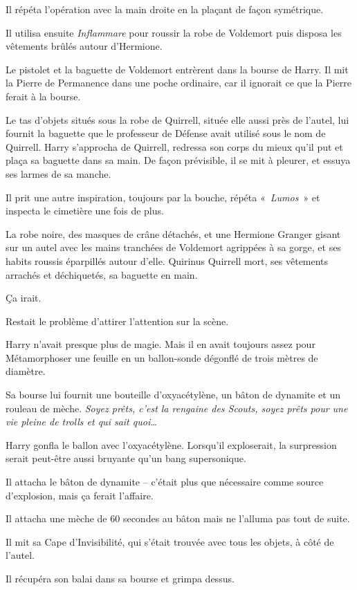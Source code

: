Il répéta l'opération avec la main droite en la plaçant de façon symétrique.

Il utilisa ensuite \emph{Inflammare} pour roussir la robe de Voldemort puis disposa les vêtements brûlés autour d'Hermione.

Le pistolet et la baguette de Voldemort entrèrent dans la bourse de Harry.
Il mit la Pierre de Permanence dans une poche ordinaire, car il ignorait ce que la Pierre ferait à la bourse.

Le tas d'objets situés sous la robe de Quirrell, située elle aussi près de l'autel, lui fournit la baguette que le professeur de Défense avait utilisé sous le nom de Quirrell.
Harry s'approcha de Quirrell, redressa son corps du mieux qu'il put et plaça sa baguette dans sa main.
De façon prévisible, il se mit à pleurer, et essuya ses larmes de sa manche.

Il prit une autre inspiration, toujours par la bouche, répéta «~\emph{Lumos}~» et inspecta le cimetière une fois de plus.

La robe noire, des masques de crâne détachés, et une Hermione Granger gisant sur un autel avec les mains tranchées de Voldemort agrippées à sa gorge, et ses habits roussis éparpillés autour d'elle.
Quirinus Quirrell mort, ses vêtements arrachés et déchiquetés, sa baguette en main.

Ça irait.

Restait le problème d'attirer l'attention sur la scène.

Harry n'avait presque plus de magie.
Mais il en avait toujours assez pour Métamorphoser une feuille en un ballon-sonde dégonflé de trois mètres de diamètre.

Sa bourse lui fournit une bouteille d'oxyacétylène, un bâton de dynamite et un rouleau de mèche.
\emph{Soyez prêts, c'est la rengaine des Scouts, soyez prêts pour une vie pleine de trolls et qui sait quoi…}

Harry gonfla le ballon avec l'oxyacétylène.
Lorsqu'il exploserait, la surpression serait peut-être aussi bruyante qu'un bang supersonique.

Il attacha le bâton de dynamite -- c'était plus que nécessaire comme source d'explosion, mais ça ferait l'affaire.

Il attacha une mèche de 60 secondes au bâton mais ne l'alluma pas tout de suite.

Il mit sa Cape d'Invisibilité, qui s'était trouvée avec tous les objets, à côté de l'autel.

Il récupéra son balai dans sa bourse et grimpa dessus.

